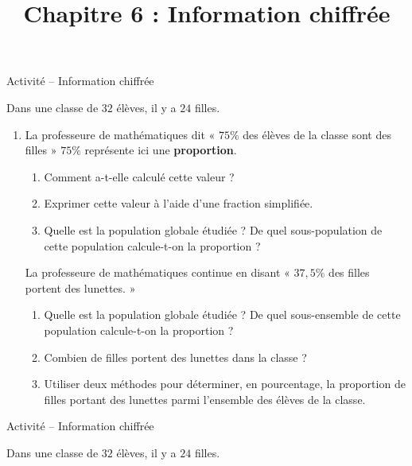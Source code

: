 \documentclass[11pt]{article}
\title{Chapitre 6 : Information chiffrée}
\date{}
\author{}
\begin{document}
\begin{center}
  \LARGE Activité -- Information chiffrée
\end{center}
Dans une classe de $32$ élèves, il y a $24$ filles.
\begin{enumerate}
  \item La professeure de mathématiques dit « $75$\% des élèves de la classe
    sont des filles » $75\%$ représente ici une \textbf{proportion}.
    \begin{enumerate}
      \item Comment a-t-elle calculé cette valeur ?
      \item Exprimer cette valeur à l'aide d'une fraction simplifiée.
      \item Quelle est la population globale étudiée ? De quel sous-population
        de cette population calcule-t-on la proportion ?
    \end{enumerate}
    La professeure de mathématiques continue en disant « $37,5\%$ des filles
    portent des lunettes. »
    \begin{enumerate}
      \item Quelle est la population globale étudiée ? De quel sous-ensemble de
        cette population calcule-t-on la proportion ?
      \item Combien de filles portent des lunettes dans la classe ?
      \item Utiliser deux méthodes pour déterminer, en pourcentage, la
        proportion de filles portant des lunettes parmi l'ensemble des élèves de
        la classe.
    \end{enumerate}
\end{enumerate}
\vspace{1cm}
\begin{center}
  \LARGE Activité -- Information chiffrée
\end{center}
Dans une classe de $32$ élèves, il y a $24$ filles.
\end{document}

